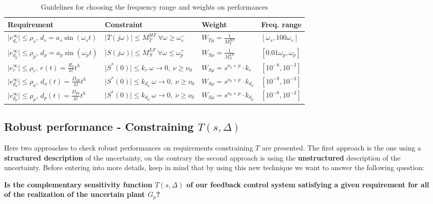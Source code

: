 \documentclass[a4paper, 12pt]{article}
\begin{document}
\begin{table}[h]
    \centering
    \begin{tabular}{p{5cm} p{5cm} p{3cm} p{3cm}}
        \midrule[1.5pt]
        \textbf{Requirement}&\textbf{Constraint}&\textbf{Weight}&\textbf{Freq. range}\\
        \midrule
        $\vert e_{d_s}^\infty \vert \le \rho_s$, $d_s=a_s\sin(\omega_s{t})$&$\vert T(j\omega) \vert \le M_T^{HF} \ \forall \omega \ge \omega_s^{-}$&$W_{T\mu}=\frac{1}{M_T^{HF}}$&$[\omega_s,100\omega_s]$\\
        \midrule
        $\vert e_{d_p}^\infty \vert \le \rho_p$, $d_p=a_p\sin(\omega_p{t})$&$\vert S(j\omega) \vert \le M_S^{LF} \ \forall \omega \le \omega_p^{+}$&$W_{S\mu}=\frac{1}{M_S^{LF}}$&$[0.01\omega_p,\omega_p]$\\
        \midrule
        $\vert e_r^\infty \vert \le \rho_r$, $r(t)=\frac{R_0}{h!}{t^h}$& $\vert S^{*}(0) \vert \le k_{r} \ \omega \to 0, \ \nu\ge\nu_0$&$W_{S\mu}=s^{\nu_0+p} \cdot k_{r}$&$[10^{-8},10^{-3}]$\\
        \midrule
        $\vert e_{d_a}^\infty \vert \le \rho_a$, $d_a(t)=\frac{D_{a0}}{h!}{t^h}$& $\vert S^{*}(0) \vert \le k_{d_a} \ \omega \to 0, \ \nu\ge\nu_0$&$W_{S\mu}=s^{\nu_0+p} \cdot k_{d_a}$&$[10^{-8},10^{-3}]$\\
        \midrule
        $\vert e_{d_p}^\infty \vert \le \rho_p$, $d_p(t)=\frac{D_{p0}}{h!}{t^h}$& $\vert S^{*}(0) \vert \le k_{d_p} \ \omega \to 0, \ \nu\ge\nu_0$&$W_{S\mu}=s^{\nu_0+p} \cdot k_{d_p}$&$[10^{-8},10^{-3}]$
    \end{tabular}
    \caption{Guidelines for choosing the frequency range and weights on performances}
    \label{tab:guideline}
\end{table}

\newpage
\subsection{Robust performance - Constraining $T(s,\Delta)$}
Here two approaches to check robust performances on requirements constraining $T$ are presented. The first approach is the one using a \textbf{structured description} of the uncertainty, on the contrary the second approach is using the \textbf{unstructured} description of the uncertainty. Before entering into more details, keep in mind that by using this new technique we want to answer the following question:
\begin{center}
    \textbf{Is the complementary sensitivity function $T(s,\Delta)$ of our feedback control system satisfying a given requirement for 
    all of the realization of the uncertain plant $G_p$?}
\end{center}
\end{document}
